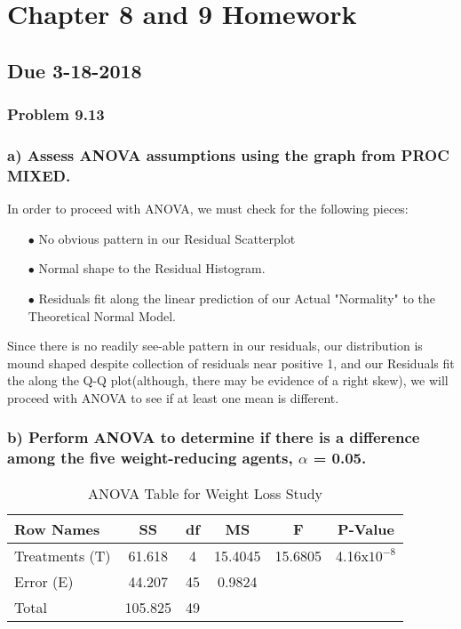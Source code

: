 \documentclass{article}
\begin{document}
\section*{Chapter 8 and 9 Homework}
\subsection*{Due 3-18-2018}
\subsubsection*{Problem 9.13}
\subsubsection*{ a) Assess ANOVA assumptions using the graph from PROC MIXED.}

In order to proceed with ANOVA, we must check for the following pieces:
\begin{itemize}[leftmargin=+.5in]
 	\item[$\bullet$] No obvious pattern in our Residual Scatterplot
	\item[$\bullet$] Normal shape to the Residual Histogram.
 	\item[$\bullet$] Residuals fit along the linear prediction of our Actual "Normality" to the Theoretical Normal Model.  
\end{itemize}
Since there is no readily see-able pattern in our residuals, our distribution is mound shaped despite collection of residuals near positive 1, and our Residuals fit the along the Q-Q plot(although, there may be evidence of a right skew), we will proceed with ANOVA to see if at least one mean is different.  

\subsubsection*{ b) Perform ANOVA to determine if there is a difference among the five weight-reducing agents, $\alpha$ = 0.05.} 
\begin{table}[ht]
\caption{ANOVA Table for Weight Loss Study}
\centering
\begin{tabular}{l c c c c c}
\hline\hline
Row Names & SS & df & MS & F & P-Value \\ [0.5ex] 
\hline
Treatments (T) & 61.618 & 4 & 15.4045 & 15.6805 & 4.16x$10^{-8}$ \\
Error (E) & 44.207 & 45 & 0.9824 & \\
Total & 105.825 & 49 &  \\ [1ex]
\hline
\end{tabular}
\label{table:nonlin}
\end{table}
\end{document}

